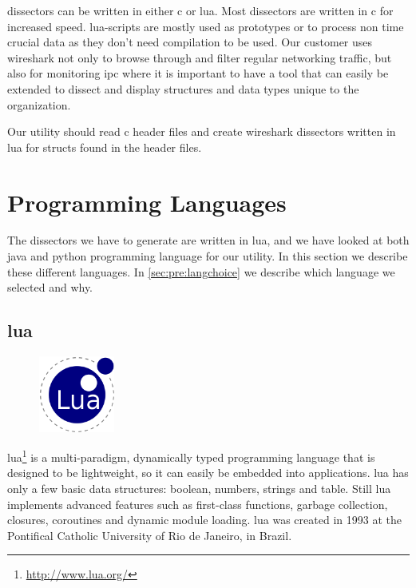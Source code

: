 \Glspl{dissector} can be written in either \Gls{c} or \Gls{lua}. Most \glspl{dissector} are written in \Gls{c}
for increased speed. \Gls{lua}-scripts are mostly used as prototypes or to process
non time crucial data as they don't need compilation to be used. Our customer
uses \Gls{wireshark} not only to browse through and filter regular networking
traffic, but also for monitoring \gls{ipc} where it is
important to have a tool that can easily be extended to dissect and display
structures and data types unique to the organization.

Our \gls{utility} should read \Gls{c} \gls{header} files and create \Gls{wireshark} \glspl{dissector} written
in \Gls{lua} for \glspl{struct} found in the \gls{header} files.


\section{Programming Languages}
\label{sec:pre:langs}
The \glspl{dissector} we have to generate are written in \Gls{lua}, and we have looked at
both \Gls{java} and \Gls{python} programming language for our \gls{utility}. In this section we
describe these different languages. In \autoref{sec:pre:langchoice} we describe
which language we selected and why.

\subsection{\Gls{lua}}
\begin{figure}
	\vspace{-10pt}
	\includegraphics[width=2.5cm]{./planning/img/lua_logo}
	\vspace{-20pt}
\end{figure}
\Gls{lua}\footnote{\url{http://www.lua.org/}} is a multi-paradigm, dynamically typed
programming language that is designed to be lightweight, so it can easily be
embedded into applications. \Gls{lua} has only a few basic data structures: boolean,
numbers, strings and table. Still \Gls{lua} implements advanced features such as
first-class functions, garbage collection, closures, coroutines and dynamic
module loading. \Gls{lua} was created in 1993 at the Pontifical Catholic University
of Rio de Janeiro, in Brazil.\cite{LuaORG}

